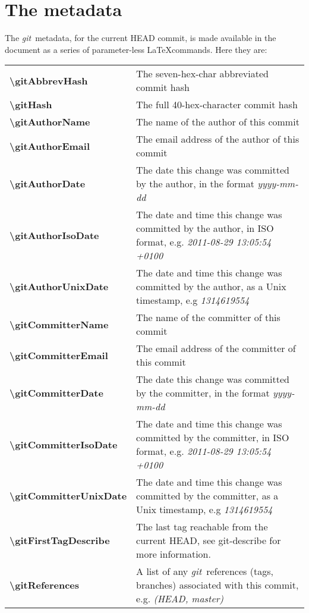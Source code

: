 \documentclass[a4paper,12pt,twoside,openany]{memoir}
\newcommand{\sfit}[1]{\textit{#1}}
\newcommand{\git}{\sfit{git}}
\begin{document}
\section{The metadata}
The \git\ metadata, for the current HEAD commit,
is made available in the document
as a series of parameter-less \LaTeX commands.
Here they are:
\vspace{0.5\baselineskip}

\noindent
\begin{tabularx}{\textwidth}{@{}>{\ttfamily\bfseries\textbackslash}lX@{}}
gitAbbrevHash&
    The seven-hex-char abbreviated commit hash
\\
gitHash&
    The full 40-hex-character commit hash
\\
gitAuthorName&
    The name of the author of this commit
\\
gitAuthorEmail&
    The email address of the author of this commit
\\
gitAuthorDate&
    The date this change was committed by the author,
    in the format \textit{yyyy-mm-dd}
\\
gitAuthorIsoDate&
    The date and time this change was committed by the author,
    in ISO format, e.g. \textit{2011-08-29 13:05:54 +0100}
\\
gitAuthorUnixDate&
    The date and time this change was committed by the author,
    as a Unix timestamp, e.g \textit{1314619554}
\\
gitCommitterName&
    The name of the committer of this commit
\\
gitCommitterEmail&
    The email address of the committer of this commit
\\
gitCommitterDate&
    The date this change was committed by the committer,
    in the format \textit{yyyy-mm-dd}
\\
gitCommitterIsoDate&
    The date and time this change was committed by the committer,
    in ISO format, e.g. \textit{2011-08-29 13:05:54 +0100}
\\
gitCommitterUnixDate&
    The date and time this change was committed by the committer,
    as a Unix timestamp, e.g \textit{1314619554}
\\
gitFirstTagDescribe&
	The last tag reachable from the current HEAD, see 
	git-describe for more information.

\\
gitReferences&
    A list of any \git\ references (tags, branches) associated
    with this commit, e.g. \textit{ (HEAD, master)}
\\
\end{tabularx}
\end{document}

